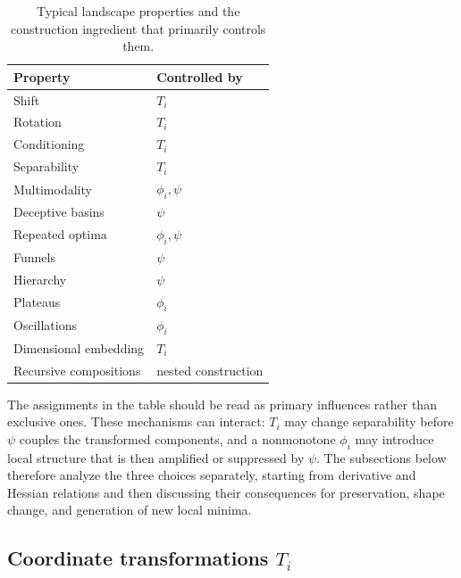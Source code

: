 \documentclass[11pt,a4paper]{article}
\theoremstyle{remark}
\theoremstyle{plain}
\begin{document}
\begin{table}[t]
	\centering
	\caption{Typical landscape properties and the construction ingredient that
	primarily controls them.}
	\label{tab:property-control}
	\begin{tabular}{ll}
		\hline
		Property & Controlled by \\
		\hline
		Shift & \(T_i\) \\
		Rotation & \(T_i\) \\
		Conditioning & \(T_i\) \\
		Separability & \(T_i\) \\
		Multimodality & \(\phi_i,\psi\) \\
		Deceptive basins & \(\psi\) \\
		Repeated optima & \(\phi_i,\psi\) \\
		Funnels & \(\psi\) \\
		Hierarchy & \(\psi\) \\
		Plateaus & \(\phi_i\) \\
		Oscillations & \(\phi_i\) \\
		Dimensional embedding & \(T_i\) \\
		Recursive compositions & nested construction \\
		\hline
	\end{tabular}
\end{table}

The assignments in the table should be read as primary influences rather than
exclusive ones. These mechanisms can interact: \(T_i\) may change separability
before \(\psi\) couples the transformed components, and a nonmonotone
\(\phi_i\) may introduce local structure that is then amplified or suppressed
by \(\psi\). The subsections below therefore analyze the three choices
separately, starting from derivative and Hessian relations and then discussing
their consequences for preservation, shape change, and generation of new local
minima.

\subsection{Coordinate transformations $T_i$}
\label{subsec:coordinate-transformations}
\end{document}
